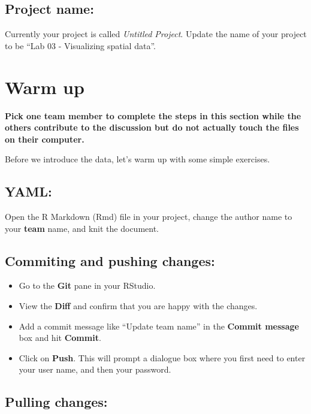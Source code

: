 \documentclass[]{book}
\providecommand{\tightlist}{%
  \setlength{\itemsep}{0pt}\setlength{\parskip}{0pt}}
\theoremstyle{definition}
\theoremstyle{definition}
\theoremstyle{definition}
\theoremstyle{remark}
\begin{document}
\section{Project name:}\label{project-name}

Currently your project is called \emph{Untitled Project}. Update the
name of your project to be ``Lab 03 - Visualizing spatial data''.

\chapter{Warm up}\label{warm-up}

\textbf{Pick one team member to complete the steps in this section while
the others contribute to the discussion but do not actually touch the
files on their computer.}

Before we introduce the data, let's warm up with some simple exercises.

\section{YAML:}\label{yaml}

Open the R Markdown (Rmd) file in your project, change the author name
to your \textbf{team} name, and knit the document.

\section{Commiting and pushing
changes:}\label{commiting-and-pushing-changes}

\begin{itemize}
\tightlist
\item
  Go to the \textbf{Git} pane in your RStudio.
\item
  View the \textbf{Diff} and confirm that you are happy with the
  changes.
\item
  Add a commit message like ``Update team name'' in the \textbf{Commit
  message} box and hit \textbf{Commit}.
\item
  Click on \textbf{Push}. This will prompt a dialogue box where you
  first need to enter your user name, and then your password.
\end{itemize}

\section{Pulling changes:}\label{pulling-changes}
\end{document}
